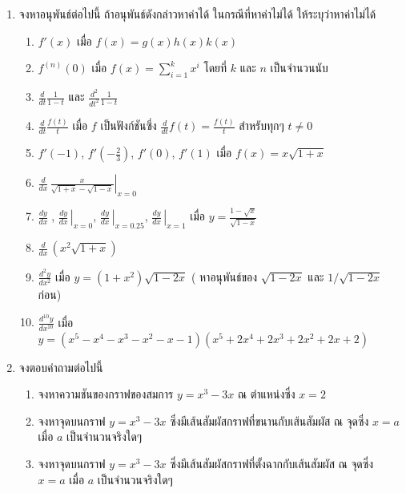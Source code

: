 \documentclass[
]{book}
\begin{document}
\begin{enumerate}
\def\labelenumi{\arabic{enumi}.}
\item
  จงหาอนุพันธ์ต่อไปนี้ ถ้าอนุพันธ์ดังกล่าวหาค่าได้ ในกรณีที่หาค่าไม่ได้ ให้ระบุว่าหาค่าไม่ได้

  \begin{enumerate}
  \def\labelenumii{\arabic{enumii}.}
  \item
    \(\displaystyle f'(x)\) เมื่อ \(f(x)=g(x)h(x)k(x)\)
  \item
    \(\displaystyle f^{(n)}(0)\) เมื่อ
    \(\displaystyle f(x)=\sum_{i=1}^k x^i\) โดยที่ \(k\) และ \(n\)
    เป็นจำนวนนับ
  \item
    \(\displaystyle\frac{d}{dt}\frac1{1-t}\) และ
    \(\displaystyle\frac{d^2}{dt^2}\frac1{1-t}\)
  \item
    \(\displaystyle\frac{d}{dt}\frac{f(t)}t\) เมื่อ \(f\) เป็นฟังก์ชันซึ่ง
    \(\displaystyle\frac{d}{dt}f(t)=\frac{f(t)}t\) สำหรับทุกๆ \(t\neq0\)
  \item
    \(f'(-1)\), \(f'(-\frac23)\), \(f'(0)\), \(f'(1)\) เมื่อ
    \(f(x)=x\sqrt{1+x}\)
  \item
    \(\displaystyle\left.\frac d{dx}\,\frac x{\sqrt{1+x}-\sqrt{1-x}}\right|_{x=0}\)
  \item
    \(\displaystyle\frac {dy}{dx}\;\),
    \(\displaystyle\left.\frac {dy}{dx}\,\right|_{x=0}\),
    \(\displaystyle\left.\frac {dy}{dx}\,\right|_{x=0.25}\),
    \(\displaystyle\left.\frac {dy}{dx}\,\right|_{x=1}\) เมื่อ
    \(\displaystyle y=\frac{1-\sqrt x}{\sqrt{1-x}}\)
  \item
    \(\displaystyle\frac d{dx}\,\left(x^2\sqrt{1+x}\right)\)
  \item
    \(\displaystyle\frac {d^2y}{dx^2}\) เมื่อ \(y=(1+x^2)\sqrt{1-2x}\) (
    หาอนุพันธ์ของ \(\sqrt{1-2x}\) และ \(1/\sqrt{1-2x}\) ก่อน)
  \item
    \(\displaystyle\frac {d^{10}y}{dx^{10}}\) เมื่อ
    \(y=\left(x^5-x^4-x^3-x^2-x-1\right)\left(x^5+2x^4+2x^3+2x^2+2x+2\right)\)
  \end{enumerate}
\item
  จงตอบคำถามต่อไปนี้

  \begin{enumerate}
  \def\labelenumii{\arabic{enumii}.}
  \item
    จงหาความชันของกราฟของสมการ \(y=x^3-3x\) ณ ตำแหน่งซึ่ง \(x=2\)
  \item
    จงหาจุดบนกราฟ \(y=x^3-3x\) ซึ่งมีเส้นสัมผัสกราฟที่ขนานกับเส้นสัมผัส ณ จุดซึ่ง
    \(x=a\) เมื่อ \(a\) เป็นจำนวนจริงใดๆ
  \item
    จงหาจุดบนกราฟ \(y=x^3-3x\) ซึ่งมีเส้นสัมผัสกราฟที่ตั้งฉากกับเส้นสัมผัส ณ จุดซึ่ง
    \(x=a\) เมื่อ \(a\) เป็นจำนวนจริงใดๆ
  \end{enumerate}
\end{enumerate}
\end{document}
